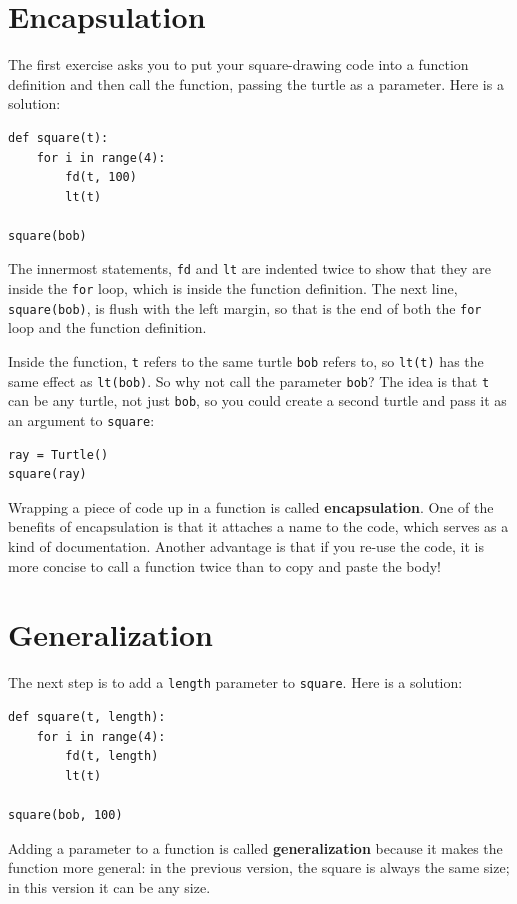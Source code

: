 \documentclass[10pt]{book}
\begin{document}
\section{Encapsulation}

The first exercise asks you to put your square-drawing code
into a function definition and then call the function, passing
the turtle as a parameter.  Here is a solution:

\beforeverb
\begin{verbatim}
def square(t):
    for i in range(4):
        fd(t, 100)
        lt(t)

square(bob)
\end{verbatim}
\afterverb
%
The innermost statements, {\tt fd} and {\tt lt} are
indented twice to show that they are inside the {\tt for} loop,
which is inside the function definition.  The next line,
{\tt square(bob)}, is flush with the left margin, so that is the
end of both the {\tt for} loop and the function definition.

Inside the function, {\tt t} refers to the same turtle {\tt bob}
refers to, so {\tt lt(t)} has the same effect as {\tt lt(bob)}.
So why not call the parameter {\tt bob}?  The idea is that {\tt t}
can be any turtle, not just {\tt bob}, so you could create
a second turtle and pass it as an argument to {\tt square}:

\beforeverb
\begin{verbatim}
ray = Turtle()
square(ray)
\end{verbatim}
\afterverb
%
Wrapping a piece of code up in a function is called {\bf
encapsulation}.  One of the benefits of encapsulation is that it
attaches a name to the code, which serves as a kind of documentation.
Another advantage is that if you re-use the code, it is more concise
to call a function twice than to copy and paste the body!



\section{Generalization}

The next step is to add a {\tt length} parameter to {\tt square}.
Here is a solution:

\beforeverb
\begin{verbatim}
def square(t, length):
    for i in range(4):
        fd(t, length)
        lt(t)

square(bob, 100)
\end{verbatim}
\afterverb
%
Adding a parameter to a function is called {\bf generalization}
because it makes the function more general: in the previous
version, the square is always the same size; in this version
it can be any size.
\end{document}
